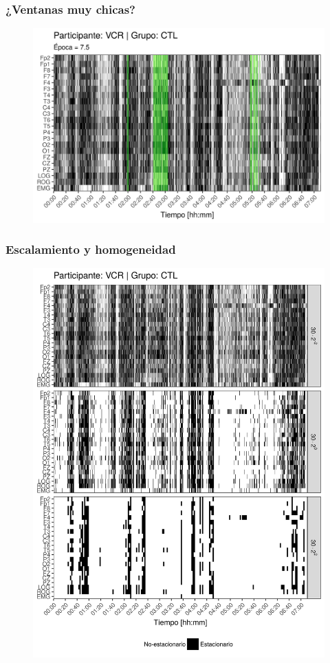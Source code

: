 \documentclass[serif,mathserif,professionalfont]{beamer}
\begin{document}
\begin{frame}\frametitle{¿Ventanas muy chicas?}
\begin{figure}
\centering
\includegraphics[width=0.9\linewidth]
{./img_art_dfa/zoom_emergencia_VCR_7_5.png} 
\end{figure}
\end{frame}

\begin{frame}\frametitle{Escalamiento y homogeneidad}
\begin{figure}
\centering
\includegraphics[width=0.55\linewidth]
{./img_art_dfa/VCNNS1_comp_est_.png}
\end{figure}
\end{frame}
\end{document}

